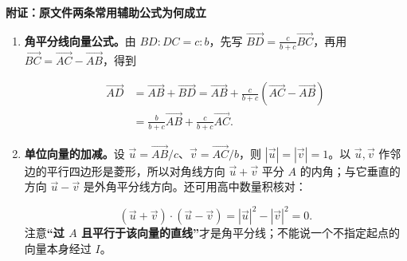 \begin{proofbox}
\textbf{附证：原文件两条常用辅助公式为何成立}
\begin{enumerate}
\item \textbf{角平分线向量公式。}由 $BD:DC=c:b$，先写 $\vec{BD}=\frac c{b+c}\vec{BC}$，再用 $\vec{BC}=\vec{AC}-\vec{AB}$，得到

\[
\begin{aligned}
\vec{AD}&=\vec{AB}+\vec{BD}
=\vec{AB}+\frac c{b+c}(\vec{AC}-\vec{AB})\\
&=\boxed{\frac b{b+c}\vec{AB}+\frac c{b+c}\vec{AC}}.
\end{aligned}
\]
\item \begin{minipage}[t]{\linewidth}\textbf{单位向量的加减。}设 $\vec u=\vec{AB}/c$、$\vec v=\vec{AC}/b$，则 $|\vec u|=|\vec v|=1$。以 $\vec u,\vec v$ 作邻边的平行四边形是菱形，所以对角线方向 $\vec u+\vec v$ 平分 $A$ 的内角；与它垂直的方向 $\vec u-\vec v$ 是外角平分线方向。还可用高中数量积核对：

\[
(\vec u+\vec v)\cdot(\vec u-\vec v)=|\vec u|^2-|\vec v|^2=0.
\]
注意\textbf{“过 $A$ 且平行于该向量的直线”}才是角平分线；不能说一个不指定起点的向量本身经过 $I$。
\end{minipage}
\end{enumerate}
\end{proofbox}
